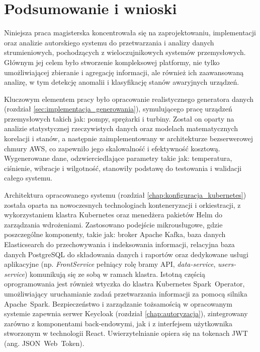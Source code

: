 \section{Podsumowanie i wnioski}
\label{sec:podsumowanie_wnioski}

Niniejsza praca magisterska koncentrowała się na zaprojektowaniu, implementacji oraz analizie autorskiego systemu do przetwarzania i analizy danych strumieniowych, pochodzących z wieloczujnikowych systemów przemysłowych. Głównym jej celem było stworzenie kompleksowej platformy, nie tylko umożliwiającej zbieranie i agregację informacji, ale również ich zaawansowaną analizę, w tym detekcję anomalii i klasyfikację stanów awaryjnych urządzeń.

Kluczowym elementem pracy było opracowanie realistycznego generatora danych (rozdział \ref{sec:implementacja_generowania}), symulującego pracę urządzeń przemysłowych takich jak: pompy, sprężarki i turbiny. Został on oparty na analizie statystycznej rzeczywistych danych oraz modelach matematycznych korelacji i stanów, a następnie zaimplementowany w architekturze bezserwerowej chmury AWS, co zapewniło jego skalowalność i efektywność kosztową. Wygenerowane dane, odzwierciedlające parametry takie jak: temperatura, ciśnienie, wibracje i wilgotność, stanowiły podstawę do testowania i walidacji całego systemu.

Architektura opracowanego systemu (rozdział \ref{chap:konfiguracja_kubernetes}) została oparta na nowoczesnych technologiach konteneryzacji i orkiestracji, z wykorzystaniem klastra Kubernetes oraz menedżera pakietów Helm do zarządzania wdrożeniami. Zastosowano podejście mikrousługowe, gdzie poszczególne komponenty, takie jak: broker Apache Kafka, baza danych Elasticsearch do przechowywania i indeksowania informacji, relacyjna baza danych PostgreSQL do składowania danych i raportów oraz dedykowane usługi aplikacyjne (np. \textit{FrontService} pełniący rolę bramy API, \textit{data-service}, \textit{users-service}) komunikują się ze sobą w ramach klastra. Istotną częścią oprogramowania jest również wtyczka do klastra Kubernetes \mbox{Spark Operator}, umożliwiający uruchamianie zadań przetwarzania informacji za pomocą silnika \mbox{Apache Spark}. Bezpieczeństwo i zarządzanie tożsamością w opracowanym systemie zapewnia serwer Keycloak (rozdział \ref{chap:autoryzacja}), zintegrowany zarówno z komponentami back-endowymi, jak i z interfejsem użytkownika stworzonym w technologii React. Uwierzytelnianie opiera się na tokenach JWT (ang. \mbox{JSON Web Token}).

